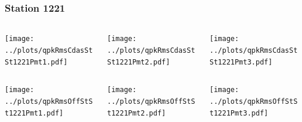 \documentclass[aspectratio=169]{beamer}
\begin{document}
\begin{frame} 
  \frametitle{Station 1221}
  \begin{center}
    \begin{columns}
      \begin{column}{0.33\textwidth}
        \texttt{[image: ../plots/qpkRmsCdasStSt1221Pmt1.pdf]}
      \end{column}
      \begin{column}{0.33\textwidth}
        \texttt{[image: ../plots/qpkRmsCdasStSt1221Pmt2.pdf]}
      \end{column}
      \begin{column}{0.33\textwidth}
        \texttt{[image: ../plots/qpkRmsCdasStSt1221Pmt3.pdf]}
      \end{column}
    \end{columns}
  \end{center}

  \begin{center}
    \begin{columns}
      \begin{column}{0.33\textwidth}
        \texttt{[image: ../plots/qpkRmsOffStSt1221Pmt1.pdf]}
      \end{column}
      \begin{column}{0.33\textwidth}
        \texttt{[image: ../plots/qpkRmsOffStSt1221Pmt2.pdf]}
      \end{column}
      \begin{column}{0.33\textwidth}
        \texttt{[image: ../plots/qpkRmsOffStSt1221Pmt3.pdf]}
      \end{column}
    \end{columns}
  \end{center}
\end{frame}
\end{document}
